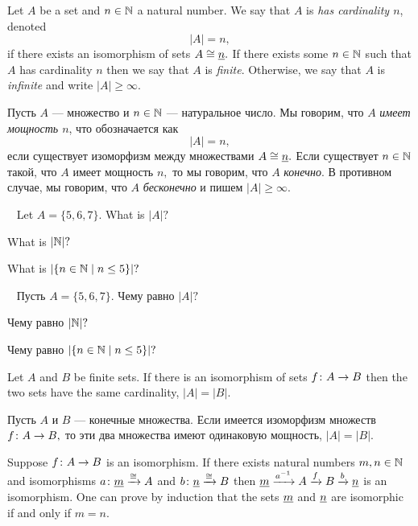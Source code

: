 \documentclass[CT4S-EN-RU]{subfiles}
\begin{document}
\begin{definitionENG}\label{def:cardinality}
Let $A$ be a set and $n\in{\mathbb N}$ a natural number. We say that $A$ is {\em has cardinality $n$}, denoted $$|A|=n,$$ if there exists an isomorphism of sets $A\cong\underline{n}.$ If there exists some $n\in{\mathbb N}$ such that $A$ has cardinality $n$ then we say that $A$ is {\em finite}. Otherwise, we say that $A$ is {\em infinite} and write $|A|\geq\infty.$
\end{definitionENG}

\begin{definitionRUS}\label{def:cardinality}
Пусть $A$ — множество и $n\in{\mathbb N}$ — натуральное число. Мы говорим, что $A$ {\em имеет мощность $n$}, что обозначается как $$|A|=n,$$ если существует изоморфизм между множествами $A\cong\underline{n}.$ Если существует $n\in{\mathbb N}$ такой, что $A$ имеет мощность $n,$ то мы говорим, что $A$ {\em конечно}. В противном случае, мы говорим, что $A$ {\em бесконечно} и пишем $|A|\geq\infty.$
\end{definitionRUS}

\begin{exerciseENG}~
\sexc Let $A=\{5,6,7\}.$ What is $|A|?$ 
\item What is $|{\mathbb N}|?$ 
\item What is $|\{n\in{\mathbb N}{\;|\;}n\leq 5\}|?$
\endsexc
\end{exerciseENG}

\begin{exerciseRUS}~
\sexc Пусть $A=\{5,6,7\}.$ Чему равно $|A|?$ 
\item Чему равно $|{\mathbb N}|?$ 
\item Чему равно $|\{n\in{\mathbb N}{\;|\;}n\leq 5\}|?$
\endsexc
\end{exerciseRUS}

\begin{lemmaENG}
Let $A$ and $B$ be finite sets. If there is an isomorphism of sets $f\colon A\rightarrow B$ then the two sets have the same cardinality, $|A|=|B|.$
\end{lemmaENG}

\begin{lemmaRUS}
Пусть $A$ и $B$ — конечные множества. Если имеется изоморфизм множеств $f\colon A\rightarrow B,$ то эти два множества имеют одинаковую мощность, $|A|=|B|.$ 
\end{lemmaRUS}

\begin{proofENG}
Suppose $f\colon A\rightarrow B$ is an isomorphism. If there exists natural numbers $m,n\in{\mathbb N}$ and isomorphisms $a\colon\underline{m}\xrightarrow{\cong} A$ and $b\colon\underline{n}\xrightarrow{\cong} B$ then $\ul{m}\To{a^\m1}A\To{f}B\To{b}\ul{n}$ is an isomorphism. One can prove by induction that the sets $\underline{m}$ and $\underline{n}$ are isomorphic if and only if $m=n.$ 
\end{proofENG}
\end{document}
